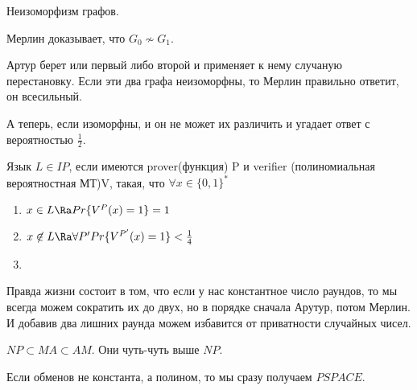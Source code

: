 \begin{exmp}
Неизоморфизм графов.

Мерлин доказывает, что $G_0 \not \sim G_1$.

Артур берет или первый либо второй и применяет к нему 
случаную перестановку. Если эти два графа неизоморфны, 
то Мерлин правильно ответит, он всесильный. 

А теперь, если изоморфны, и он не может их 
различить и угадает ответ с вероятностью $\frac{1}{2}$. 
\end{exmp}

\begin{Def}
Язык $L \in IP$, если имеются prover(функция) P и verifier 
(полиномиальная вероятностная МТ)V, такая, что $\forall x \in \{0, 1\}^{*}$\\
\begin{enumerate}
\item 
$x \in L \Ra Pr\{V^{P}(x) = 1\} = 1$\\
\item 
$x \not \in L \Ra \forall P' Pr\{V^{P'}(x) = 1\} < \frac{1}{4}$\\
\item 
\end{enumerate}
\end{Def}


Правда жизни состоит в том, что если у нас константное число 
раундов, то мы всегда можем сократить их до 
двух, но в порядке сначала Арутур, потом Мерлин. И добавив два лишних
раунда можем избавится от приватности случайных чисел. 

$NP \subset MA \subset AM$. Они чуть-чуть выше $NP$.

Если обменов не константа, а полином, то мы сразу получаем $PSPACE$.